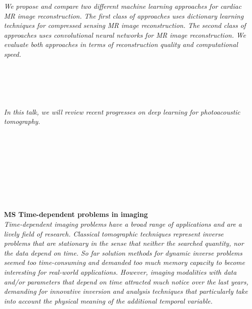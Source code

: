 \begin{multicols}{2}
\\ 
        \\
        \\\\
\\
      \textit{We propose and compare two different machine learning approaches for cardiac MR image reconstruction. The first class of approaches uses dictionary learning techniques for compressed sensing MR image reconstruction. The second class of approaches uses convolutional neural networks for MR image reconstruction. We evaluate both approaches in terms of reconstruction quality and computational speed.}\\
\\ 
        \\
        \\\\
\\
      \textit{In this talk, we will review recent progresses on deep learning for photoacoustic tomography.}\\
\\ 
        \\
        \\\\
        \\
        \\\\
\\
\end{multicols}
  \noindent\textbf{MS Time-dependent problems in imaging}\\
  \textit{Time-dependent imaging problems have a broad range of applications and are a lively field of research. Classical tomographic techniques represent inverse problems that are stationary in the sense that neither the searched quantity, nor the data depend on time. So far solution methods for dynamic inverse problems seemed too time-consuming and demanded too much memory capacity to become interesting for real-world applications. However, imaging modalities with data and/or parameters that depend on time attracted much notice over the last years, demanding for innovative inversion and analysis techniques that particularly take into account the physical meaning of the additional temporal variable.} \\
    
